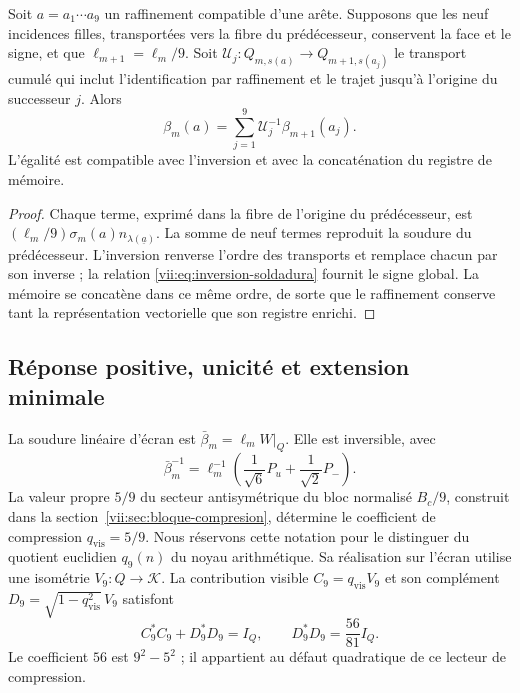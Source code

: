 \begin{proposition}
\label{vii:prop:refinamiento-soldadura}
Soit \(a=a_1\cdots a_9\) un raffinement compatible d’une arête.
Supposons que les neuf incidences filles, transportées vers la fibre du
prédécesseur, conservent la face et le signe, et que
\(\ell_{m+1}=\ell_m/9\). Soit
\(\mathcal U_j:Q_{m,s(a)}\longrightarrow Q_{m+1,s(a_j)}\)
le transport cumulé qui inclut l’identification par raffinement
et le trajet jusqu’à l’origine du successeur \(j\). Alors
\[
 \beta_m(a)=
 \sum_{j=1}^{9}\mathcal U_j^{-1}\beta_{m+1}(a_j).
\]
L'égalité est compatible avec l'inversion et avec la concaténation du registre de mémoire.
\end{proposition}

\begin{proof}
Chaque terme, exprimé dans la fibre de l’origine du prédécesseur, est
\((\ell_m/9)\sigma_m(a)n_{\lambda(\underline a)}\).
La somme de neuf termes reproduit la soudure du prédécesseur.
L’inversion renverse l’ordre des transports et remplace chacun
par son inverse ; la relation \eqref{vii:eq:inversion-soldadura} fournit
le signe global. La mémoire se concatène dans ce même ordre, de sorte
que le raffinement conserve tant la représentation vectorielle que son
registre enrichi.
\end{proof}

\subsection{Réponse positive, unicité et extension minimale}
\label{vii:sec:respuesta-positiva}

La soudure linéaire d'écran est \(\bar\beta_m=\ell_mW|_Q\). Elle est inversible, avec
\[
 \bar\beta_m^{-1}
 =\ell_m^{-1}\left(\frac1{\sqrt6}P_u+\frac1{\sqrt2}P_-\right).
\]
La valeur propre \(5/9\) du secteur antisymétrique du bloc normalisé \(B_c/9\), construit dans la section~\ref{vii:sec:bloque-compresion}, détermine le coefficient de compression \(q_{\mathrm{vis}}=5/9\). Nous réservons cette notation pour le distinguer du quotient euclidien \(q_9(n)\) du noyau arithmétique. Sa réalisation sur l'écran utilise une isométrie \(V_9:Q\longrightarrow\mathcal K\). La contribution visible \(C_9=q_{\mathrm{vis}}V_9\) et son complément \(D_9=\sqrt{1-q_{\mathrm{vis}}^2}\,V_9\) satisfont
\[
 C_9^*C_9+D_9^*D_9=I_Q,\qquad D_9^*D_9=\frac{56}{81}I_Q.
\]
Le coefficient \(56\) est \(9^2-5^2\) ; il appartient au défaut quadratique
de ce lecteur de compression.

